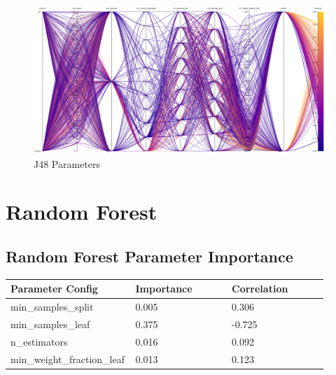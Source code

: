 \documentclass[11pt]{article}
\begin{document}
\begin{appendices}
\begin{figure}[h]
  \caption {J48 Parameters} \label{ParallelCoordJ48}
  \centering 
  \includegraphics[width = \textwidth, height = \textwidth, keepaspectratio]{Images/J48 ParallelCoordGraph.png}
\end{figure}



\FloatBarrier
\newpage
\section{Random Forest}

\subsection{Random Forest Parameter Importance}
  \begin{table}[ht]
    \centering
    \begin{tabular}{|p{0.3\linewidth} | p{0.3\linewidth}| p{0.3\linewidth}|} 
      \hline
      \textbf{Parameter Config}  & \textbf{Importance} & \textbf{Correlation} \\ \hline
        min\_samples\_split & 0.005 & 0.306 \\ \hline
        min\_samples\_leaf & 0.375 & -0.725 \\ \hline
        n\_estimators & 0.016 & 0.092 \\ \hline
        min\_weight\_fraction\_leaf & 0.013 & 0.123 \\ \hline
    \end{tabular}
  \end{table}\label{RF_ParamImp1}


\end{appendices}
\end{document}

